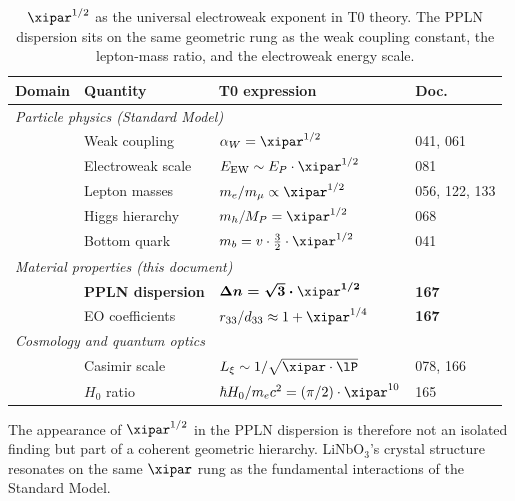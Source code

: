 \begin{table}[H]
    \centering
    \begin{tabular}{llll}
        \toprule
        \textbf{Domain} & \textbf{Quantity} &
        \textbf{T0 expression} & \textbf{Doc.} \\
        \midrule
        \multicolumn{4}{l}{\itshape Particle physics (Standard Model)} \\[2pt]
        & Weak coupling       & $\alpha_W = \xipar^{1/2}$
            & 041, 061 \\
        & Electroweak scale   & $E_\mathrm{EW} \sim E_P\cdot\xipar^{1/2}$
            & 081 \\
        & Lepton masses       & $m_e/m_\mu \propto \xipar^{1/2}$
            & 056, 122, 133 \\
        & Higgs hierarchy     & $m_h/M_P = \xipar^{1/2}$
            & 068 \\
        & Bottom quark        & $m_b = v\cdot\tfrac{3}{2}\cdot\xipar^{1/2}$
            & 041 \\
        \midrule
        \multicolumn{4}{l}{\itshape Material properties (this document)} \\[2pt]
        & \textbf{PPLN dispersion}
            & $\boldsymbol{\Delta n = \sqrt{3}\cdot\xipar^{1/2}}$
            & \textbf{167} \\
        & EO coefficients
            & $r_{33}/d_{33} \approx 1 + \xipar^{1/4}$
            & \textbf{167} \\
        \midrule
        \multicolumn{4}{l}{\itshape Cosmology and quantum optics} \\[2pt]
        & Casimir scale       & $L_\xi \sim 1/\sqrt{\xipar\cdot\lP}$
            & 078, 166 \\
        & $H_0$ ratio         & $\hbar H_0/m_ec^2 = (\pi/2)\cdot\xipar^{10}$
            & 165 \\
        \bottomrule
    \end{tabular}
    \caption{$\xipar^{1/2}$ as the universal electroweak exponent in T0 theory.
    The PPLN dispersion sits on the same geometric rung as the weak coupling
    constant, the lepton-mass ratio, and the electroweak energy scale.}
    \label{tab:universal}
\end{table}

\medskip
The appearance of $\xipar^{1/2}$ in the PPLN dispersion is therefore not
an isolated finding but part of a coherent geometric hierarchy. LiNbO$_3$'s
crystal structure resonates on the same $\xipar$ rung as the fundamental
interactions of the Standard Model.

